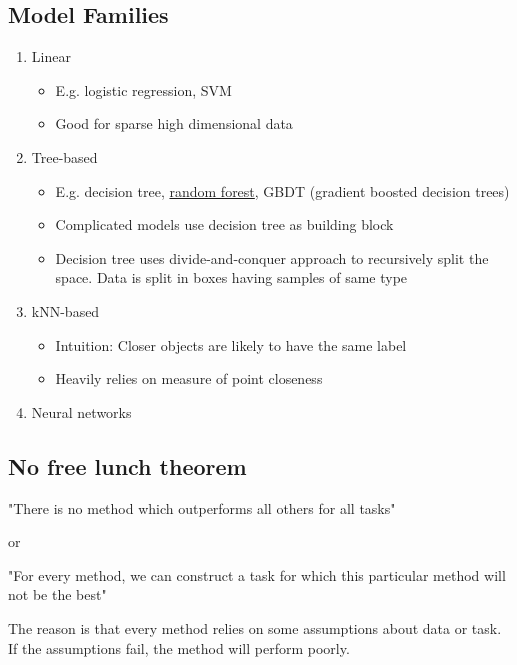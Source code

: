 \documentclass[a4paper]{article}
\begin{document}
\subsection{Model Families}
\begin{enumerate}
\item Linear
	\begin{itemize}
	\item E.g. logistic regression, SVM	
	\item Good for sparse high dimensional data
	\end{itemize}
\item Tree-based
	\begin{itemize}
	\item E.g. decision tree, \href{https://www.datasciencecentral.com/profiles/blogs/random-forests-explained-intuitively}{random forest}, GBDT (gradient boosted decision trees)
	\item Complicated models use decision tree as building block
	\item Decision tree uses divide-and-conquer approach to recursively split the space. Data is split in boxes having samples of same type
	\end{itemize}
\item kNN-based
	\begin{itemize}
	\item Intuition: Closer objects are likely to have the same label
	\item Heavily relies on measure of point closeness	
	\end{itemize}
\item Neural networks
\end{enumerate}

\subsection{No free lunch theorem}
"There is no method which outperforms all others for all tasks"

or

"For every method, we can construct a task for which this particular method will not be the best"

The reason is that every method relies on some assumptions about data or task. If the assumptions fail, the method will perform poorly.
\end{document}
